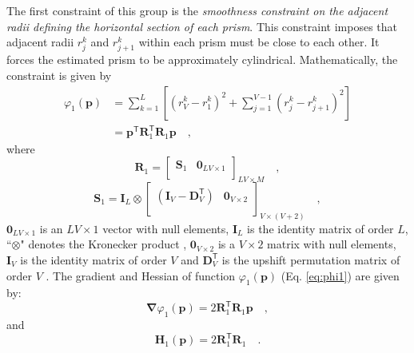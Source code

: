 The first constraint of this group is the \textit{smoothness constraint on the adjacent radii defining the horizontal section of each prism}. This constraint imposes that adjacent radii $r_{j}^{k}$ and $r_{j+1}^{k}$ within each prism must be close to each other. It forces the estimated prism to be approximately cylindrical. Mathematically, the constraint is given by \begin{equation}\label{eq:phi1}
\begin{split}
\varphi_{1}(\mathbf{p}) &= \sum\limits^{L}_{k=1}\left[\left(r^{k}_{V}-r^{k}_{1}\right)^2 + \sum\limits^{V-1}_{j=1}\left(r^{k}_{j}-r^{k}_{j+1}\right)^2\right]\\
 &= \mathbf{p}^{\mathsf{T}} \mathbf{R}^{\mathsf{T}}_{1}\mathbf{R}_{1} \mathbf{p} \quad ,
\end{split}
\end{equation}
where
\begin{equation}
\mathbf{R}_{1} = 
\begin{bmatrix}
\mathbf{S}_{1} &
\mathbf{0}_{LV \times 1} \\
\end{bmatrix}_{LV \times M} \quad ,
\label{eq:R1-matrix}
\end{equation}
\begin{equation}
\mathbf{S}_{1} = 
\mathbf{I}_{L} \otimes 
\begin{bmatrix}
\left( \mathbf{I}_{V} - \mathbf{D}_{V}^\mathsf{T} \right) & \mathbf{0}_{V \times 2} \\
\end{bmatrix}_{V \times (V+2)} \quad ,
\label{eq:S1-matrix}
\end{equation}
$ \mathbf{0}_{LV \times 1} $ is an $ LV \times 1 $ vector with null elements,
$\mathbf{I}_{L}$ is the identity matrix of order $L$, ``$\otimes$" denotes the Kronecker product \cite[][ p. 243]{horn_johnson1991}, $\mathbf{0}_{V \times 2}$ is a $V \times 2$ matrix with null elements, 
$\mathbf{I}_{V}$ is the identity matrix of order $V$ and $\mathbf{D}_{V}^\mathsf{T}$ is the upshift permutation matrix of order $V$ \cite[][ p. 20]{golub-vanloan2013}. The gradient and Hessian of function $\varphi_{1}(\mathbf{p})$ (Eq. \ref{eq:phi1}) are given by:
\begin{equation}\label{eq:phi1_grad}
\boldsymbol{\nabla}\varphi_{1}(\mathbf{p}) = 2 \mathbf{R}^\mathsf{T}_{1}\mathbf{R}_{1}\mathbf{p} \quad ,
\end{equation}
and
\begin{equation}\label{eq:phi1_hessian}
\mathbf{H}_{1}(\mathbf{p}) = 2\mathbf{R}^\mathsf{T}_{1}\mathbf{R}_{1} \quad .
\end{equation}

